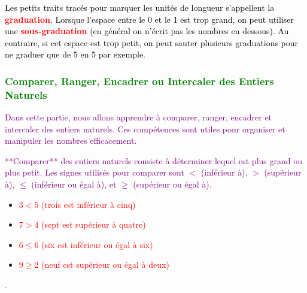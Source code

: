 \documentclass{article}
\begin{document}
\vspace{0.5cm}

\begin{tcolorbox}[colback=cyan!10!white, colframe=lime!75!black, title=\textcolor{black}{Remarque}, sharp corners=southwest]
\textcolor{black}{Les petits traits tracés pour marquer les unités de longueur s'appellent la \textbf{\textcolor{red}{graduation}}. Lorsque l'espace entre le 0 et le 1 est trop grand, on peut utiliser une \textbf{\textcolor{red}{sous-graduation}} (en général on n'écrit pas les nombres en dessous). Au contraire, si cet espace est trop petit, on peut sauter plusieurs graduations pour ne graduer que de 5 en 5 par exemple.}
\end{tcolorbox}

\vspace{0.5cm}

\subsubsection{\textcolor{green}{Comparer, Ranger, Encadrer ou Intercaler des Entiers Naturels}}

\textcolor{purple}{Dans cette partie, nous allons apprendre à comparer, ranger, encadrer et intercaler des entiers naturels. Ces compétences sont utiles pour organiser et manipuler les nombres efficacement.}

\vspace{0.5cm}

\textcolor{purple}{**Comparer** des entiers naturels consiste à déterminer lequel est plus grand ou plus petit. Les signes utilisés pour comparer sont \(<\) (inférieur à), \(>\) (supérieur à), \(\leq\) (inférieur ou égal à), et \(\geq\) (supérieur ou égal à).}

\vspace{0.5cm}

\begin{tcolorbox}[colback=orange!10!white, colframe=orange!75!black, title=\textcolor{white}{Exemples}, sharp corners=southwest]

\begin{itemize}
    \item \textcolor{red}{\(3 < 5\) (trois est inférieur à cinq)}
    \item \textcolor{red}{\(7 > 4\) (sept est supérieur à quatre)}
    \item \textcolor{red}{\(6 \leq 6\) (six est inférieur ou égal à six)}
    \item \textcolor{red}{\(9 \geq 2\) (neuf est supérieur ou égal à deux)}
\end{itemize}.
\end{tcolorbox}
\end{document}
